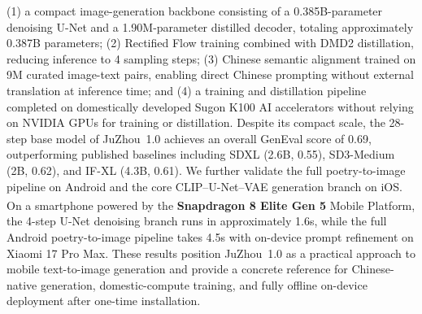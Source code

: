 \documentclass[11pt,a4paper]{article}
\begin{document}
\begin{center}
\begin{tcolorbox}[colback=gray!10, colframe=white, arc=5pt, boxrule=0pt, left=6pt, right=6pt, top=8pt, bottom=8pt, width=\textwidth]
(1) a compact image-generation backbone consisting of a 0.385B-parameter denoising U-Net and a 1.90M-parameter distilled decoder, totaling approximately 0.387B parameters;
(2) Rectified Flow training combined with DMD2 distillation, reducing inference to 4 sampling steps;
(3) Chinese semantic alignment trained on 9M curated image-text pairs, enabling direct Chinese prompting without external translation at inference time; and
(4) a training and distillation pipeline completed on domestically developed Sugon K100 AI accelerators without relying on NVIDIA GPUs for training or distillation.
Despite its compact scale, the 28-step base model of JuZhou~1.0 achieves an overall GenEval score of 0.69, outperforming published baselines including SDXL (2.6B, 0.55), SD3-Medium (2B, 0.62), and IF-XL (4.3B, 0.61).
We further validate the full poetry-to-image pipeline on Android and the core CLIP--U-Net--VAE generation branch on iOS.
On a smartphone powered by the \textbf{Snapdragon\textsuperscript{\textregistered} 8 Elite Gen 5} Mobile Platform, the 4-step U-Net denoising branch runs in approximately 1.6s, while the full Android poetry-to-image pipeline takes 4.5s with on-device prompt refinement on Xiaomi 17 Pro Max.
These results position JuZhou~1.0 as a practical approach to mobile text-to-image generation and provide a concrete reference for Chinese-native generation, domestic-compute training, and fully offline on-device deployment after one-time installation.
\end{tcolorbox}
\end{center}














\end{document}
